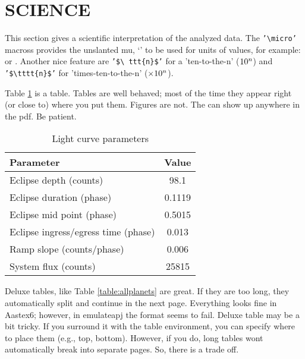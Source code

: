 \section{SCIENCE}
\label{sec:science}

This section gives a scientific interpretation of the analyzed data.
The \texttt{'\textbackslash micro'} macross provides the unslanted mu,
`{\micro}' to be used for units of values, for example: {\micron} or
{\microbar}.  Another nice feature are \texttt{'\$\textbackslash
  ttt\{n\}\$'} for a 'ten-to-the-n' ($\ttt{n}$) and
\texttt{'\$\textbackslash tttt\{n\}\$'} for 'times-ten-to-the-n'
($\tttt{n}$).

Table \ref{table:parameters} is a table.  Tables are well behaved;
most of the time they appear right (or close to) where you put them.
Figures are not.  The can show up anywhere in the pdf.   Be patient.

\begin{table}[ht]
\centering
\caption{\label{table:parameters} Light curve parameters}
\begin{tabular}{lc}
\hline
\hline
Parameter                           & Value           \\
\hline
Eclipse depth (counts)              & 98.1            \\
Eclipse duration (phase)            & 0.1119          \\
Eclipse mid point (phase)           & 0.5015          \\
Eclipse ingress/egress time (phase) & 0.013           \\
Ramp slope (counts/phase)           & 0.006           \\
System flux (counts)                & 25815           \\
\hline
\end{tabular}
\end{table}


Deluxe tables, like Table \ref{table:allplanets} are great. If they
are too long, they automatically split and continue in the next
page. Everything looks fine in Aastex6; however, in emulateapj the
format seems to fail.
Deluxe table may be a bit tricky. If you surround it with the table
environment, you can specify where to place them (e.g., top, bottom).
However, if you do, long tables wont automatically break into separate
pages.  So, there is a trade off.

